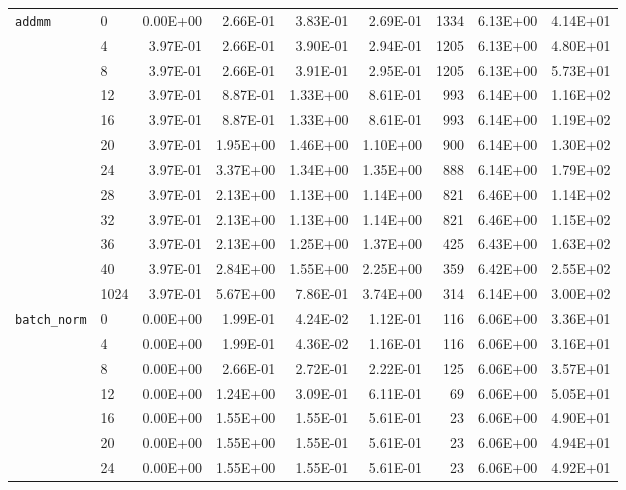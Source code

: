 \begin{longtable}{llrrrrrrr}
\bottomrule
\endlastfoot
\texttt{addmm} & 0    &   0.00E+00 & 2.66E-01 & 3.83E-01 & 2.69E-01 &    1334 &     6.13E+00 & 4.14E+01 \\
         & 4    &   3.97E-01 & 2.66E-01 & 3.90E-01 & 2.94E-01 &    1205 &     6.13E+00 & 4.80E+01 \\
         & 8    &   3.97E-01 & 2.66E-01 & 3.91E-01 & 2.95E-01 &    1205 &     6.13E+00 & 5.73E+01 \\
         & 12   &   3.97E-01 & 8.87E-01 & 1.33E+00 & 8.61E-01 &     993 &     6.14E+00 & 1.16E+02 \\
         & 16   &   3.97E-01 & 8.87E-01 & 1.33E+00 & 8.61E-01 &     993 &     6.14E+00 & 1.19E+02 \\
         & 20   &   3.97E-01 & 1.95E+00 & 1.46E+00 & 1.10E+00 &     900 &     6.14E+00 & 1.30E+02 \\
         & 24   &   3.97E-01 & 3.37E+00 & 1.34E+00 & 1.35E+00 &     888 &     6.14E+00 & 1.79E+02 \\
         & 28   &   3.97E-01 & 2.13E+00 & 1.13E+00 & 1.14E+00 &     821 &     6.46E+00 & 1.14E+02 \\
         & 32   &   3.97E-01 & 2.13E+00 & 1.13E+00 & 1.14E+00 &     821 &     6.46E+00 & 1.15E+02 \\
         & 36   &   3.97E-01 & 2.13E+00 & 1.25E+00 & 1.37E+00 &     425 &     6.43E+00 & 1.63E+02 \\
         & 40   &   3.97E-01 & 2.84E+00 & 1.55E+00 & 2.25E+00 &     359 &     6.42E+00 & 2.55E+02 \\
         & 1024 &   3.97E-01 & 5.67E+00 & 7.86E-01 & 3.74E+00 &     314 &     6.14E+00 & 3.00E+02 \\
\texttt{batch\_norm} & 0    &   0.00E+00 & 1.99E-01 & 4.24E-02 & 1.12E-01 &     116 &     6.06E+00 & 3.36E+01 \\
         & 4    &   0.00E+00 & 1.99E-01 & 4.36E-02 & 1.16E-01 &     116 &     6.06E+00 & 3.16E+01 \\
         & 8    &   0.00E+00 & 2.66E-01 & 2.72E-01 & 2.22E-01 &     125 &     6.06E+00 & 3.57E+01 \\
         & 12   &   0.00E+00 & 1.24E+00 & 3.09E-01 & 6.11E-01 &      69 &     6.06E+00 & 5.05E+01 \\
         & 16   &   0.00E+00 & 1.55E+00 & 1.55E-01 & 5.61E-01 &      23 &     6.06E+00 & 4.90E+01 \\
         & 20   &   0.00E+00 & 1.55E+00 & 1.55E-01 & 5.61E-01 &      23 &     6.06E+00 & 4.94E+01 \\
         & 24   &   0.00E+00 & 1.55E+00 & 1.55E-01 & 5.61E-01 &      23 &     6.06E+00 & 4.92E+01 \\

\end{longtable}
